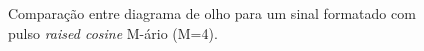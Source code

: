 \begin{figure}[H]
\begin{center}
\end{center}
\caption{Comparação entre diagrama de olho para um sinal formatado com pulso \textit{raised cosine} M-ário (M=4).}
\label{fig:6} 
\end{figure}



